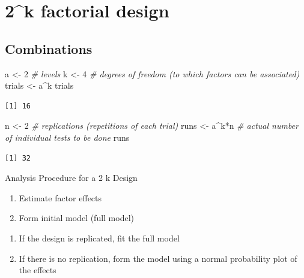 \documentclass[
]{book}
\newenvironment{Shaded}{\begin{snugshade}}{\end{snugshade}}
\newcommand{\CommentTok}[1]{\textcolor[rgb]{0.56,0.35,0.01}{\textit{#1}}}
\newcommand{\DecValTok}[1]{\textcolor[rgb]{0.00,0.00,0.81}{#1}}
\newcommand{\NormalTok}[1]{#1}
\newcommand{\OtherTok}[1]{\textcolor[rgb]{0.56,0.35,0.01}{#1}}
\newcommand{\SpecialCharTok}[1]{\textcolor[rgb]{0.00,0.00,0.00}{#1}}
\providecommand{\tightlist}{%
  \setlength{\itemsep}{0pt}\setlength{\parskip}{0pt}}
\begin{document}
\hypertarget{k-factorial-design}{%
\section{2\^{}k factorial design}\label{k-factorial-design}}

\hypertarget{combinations}{%
\subsection{Combinations}\label{combinations}}

\begin{Shaded}
\begin{Highlighting}[]
\NormalTok{a }\OtherTok{\textless{}{-}} \DecValTok{2}   \CommentTok{\# levels}
\NormalTok{k }\OtherTok{\textless{}{-}} \DecValTok{4}   \CommentTok{\# degrees of freedom (to which factors can be associated)}
\NormalTok{trials }\OtherTok{\textless{}{-}}\NormalTok{ a}\SpecialCharTok{\^{}}\NormalTok{k}
\NormalTok{trials}
\end{Highlighting}
\end{Shaded}

\begin{verbatim}
[1] 16
\end{verbatim}

\begin{Shaded}
\begin{Highlighting}[]
\NormalTok{n }\OtherTok{\textless{}{-}} \DecValTok{2}   \CommentTok{\# replications (repetitions of each trial)}
\NormalTok{runs }\OtherTok{\textless{}{-}}\NormalTok{ a}\SpecialCharTok{\^{}}\NormalTok{k}\SpecialCharTok{*}\NormalTok{n }\CommentTok{\# actual number of individual tests to be done}
\NormalTok{runs}
\end{Highlighting}
\end{Shaded}

\begin{verbatim}
[1] 32
\end{verbatim}

Analysis Procedure for a 2 k Design

\begin{enumerate}
\def\labelenumi{\arabic{enumi}.}
\tightlist
\item
  Estimate factor effects
\item
  Form initial model (full model)
\end{enumerate}

\begin{enumerate}
\def\labelenumi{\alph{enumi}.}
\tightlist
\item
  If the design is replicated, fit the full model
\item
  If there is no replication, form the model using a normal probability plot of the effects
\end{enumerate}
\end{document}
